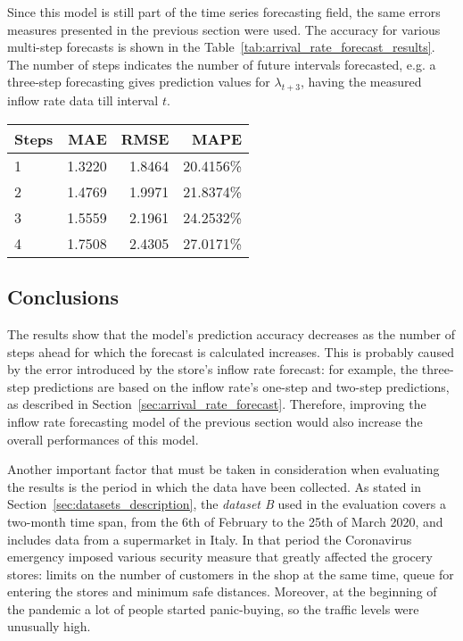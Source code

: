 Since this model is still part of the time series forecasting field, the same errors measures presented in the previous section were used. The accuracy for various multi-step forecasts is shown in the Table~\ref{tab:arrival_rate_forecast_results}. The number of steps indicates the number of future intervals forecasted, e.g. a three-step forecasting gives prediction values for \( \lambda_{t+3} \), having the measured inflow rate data till interval \( t \).

\begin{center}
  \begin{tabular}{ l r r r }
    \hline
    Steps & MAE    & RMSE   & MAPE      \\
    \hline
    1     & 1.3220 & 1.8464 & 20.4156\% \\
    2     & 1.4769 & 1.9971 & 21.8374\% \\
    3     & 1.5559 & 2.1961 & 24.2532\% \\
    4     & 1.7508 & 2.4305 & 27.0171\% \\
    \hline
  \end{tabular}
\end{center}

\subsection{Conclusions}
\label{subsec:arrival_rate_forecast_results_conclusions}

The results show that the model’s prediction accuracy decreases as the number of steps ahead for which the forecast is calculated increases. This is probably caused by the error introduced by the store’s inflow rate forecast: for example, the three-step predictions are based on the inflow rate’s one-step and two-step predictions, as described in Section~\ref{sec:arrival_rate_forecast}. Therefore, improving the inflow rate forecasting model of the previous section would also increase the overall performances of this model.

Another important factor that must be taken in consideration when evaluating the results is the period in which the data have been collected. As stated in Section~\ref{sec:datasets_description}, the \emph{dataset B} used in the evaluation covers a two-month time span, from the 6th of February to the 25th of March 2020, and includes data from a supermarket in Italy. In that period the Coronavirus emergency imposed various security measure that greatly affected the grocery stores: limits on the number of customers in the shop at the same time, queue for entering the stores and minimum safe distances. Moreover, at the beginning of the pandemic a lot of people started panic-buying, so the traffic levels were unusually high.

